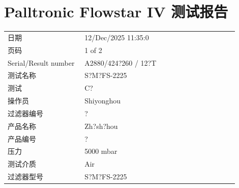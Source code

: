\documentclass[UTF8,10pt,a4paper,fontset=fandol]{ctexart}
\newcommand{\fieldvalue}[1]{#1}
\begin{document}
\section*{Palltronic Flowstar IV 测试报告}

\begin{tabular}{@{}p{0.30\linewidth}p{0.60\linewidth}@{}}
日期 &
\fieldvalue{12/Dec/2025 11:35:0} \\

页码 &
\fieldvalue{1 of 2} \\

Serial/Result number &
\fieldvalue{A2880/424?260 / 12?T} \\

测试名称 &
\fieldvalue{S?M?FS-2225} \\

测试 &
\fieldvalue{C?} \\

操作员 &
\fieldvalue{Shiyonghou} \\

过滤器编号 &
\fieldvalue{?} \\

产品名称 &
\fieldvalue{Zh?sh?hou} \\

产品编号 &
\fieldvalue{?} \\

压力 &
\fieldvalue{5000 mbar} \\

测试介质 &
\fieldvalue{Air} \\

过滤器型号 &
\fieldvalue{S?M?FS-2225} \\


\end{tabular}
\end{document}
